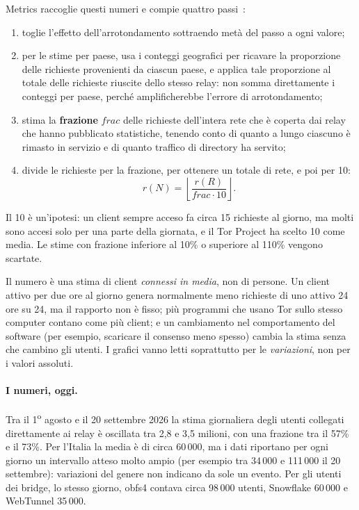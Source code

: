 Metrics raccoglie questi numeri e compie quattro passi~\cite{metricsreproducible}:
\begin{enumerate}
  \item toglie l'effetto dell'arrotondamento sottraendo metà del passo a ogni valore;
  \item per le stime per paese, usa i conteggi geografici per ricavare la
  proporzione delle richieste provenienti da ciascun paese, e applica
  tale proporzione al totale delle richieste riuscite dello stesso relay:
  non somma direttamente i conteggi per paese, perché amplificherebbe
  l'errore di arrotondamento;
  \item stima la \textbf{frazione} $\mathit{frac}$ delle richieste dell'intera rete che è coperta dai relay che hanno pubblicato statistiche, tenendo conto di quanto a lungo ciascuno è rimasto in servizio e di quanto traffico di directory ha servito;
  \item divide le richieste per la frazione, per ottenere un totale di rete, e poi per 10:
\[ r(N) = \left\lfloor \frac{r(R)}{\mathit{frac} \cdot 10} \right\rfloor. \]
\end{enumerate}
Il 10 è un'ipotesi: un client sempre acceso fa circa 15 richieste al giorno, ma molti sono accesi solo per una parte della giornata, e il Tor Project ha scelto 10 come media. Le stime con frazione inferiore al 10\% o superiore al 110\% vengono scartate.

\begin{attenzione}
Il numero è una stima di client \emph{connessi in media}, non di persone. Un client attivo per due ore al giorno genera normalmente meno richieste di uno attivo 24 ore su 24, ma il rapporto non è fisso; più programmi che usano Tor sullo stesso computer contano come più client; e un cambiamento nel comportamento del software (per esempio, scaricare il consenso meno spesso) cambia la stima senza che cambino gli utenti. I grafici vanno letti soprattutto per le \emph{variazioni}, non per i valori assoluti.
\end{attenzione}

\paragraph{I numeri, oggi.} Tra il 1\textsuperscript{o} agosto e il 20 settembre 2026 la stima giornaliera degli utenti collegati direttamente ai relay è oscillata tra 2,8 e 3,5 milioni, con una frazione tra il 57\% e il 73\%. Per l'Italia la media è di circa 60\,000, ma i dati riportano per ogni giorno un intervallo atteso molto ampio (per esempio tra 34\,000 e 111\,000 il 20 settembre): variazioni del genere non indicano da sole un evento. Per gli utenti dei bridge, lo stesso giorno, obfs4 contava circa 98\,000 utenti, Snowflake 60\,000 e WebTunnel 35\,000.

